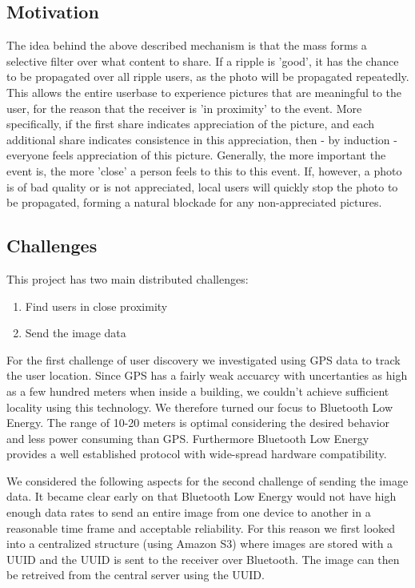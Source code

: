 \documentclass{report}
\begin{document}
\subsection{Motivation}
The idea behind the above described mechanism is that the mass forms a selective filter over what content to share. 
If a ripple is 'good', it has the chance to be propagated over all ripple users, as the photo will be propagated repeatedly. 
This allows the entire userbase to experience pictures that are meaningful to the user, for the reason that the receiver is 'in proximity' to the event. 
More specifically, if the first share indicates appreciation of the picture, and each additional share indicates consistence in this appreciation, then - by induction - everyone feels appreciation of this picture.
Generally, the more important the event is, the more 'close' a person feels to this to this event. 
If, however, a photo is of bad quality or is not appreciated, local users will quickly stop the photo to be propagated, forming a natural blockade for any non-appreciated pictures.

\subsection{Challenges}
This project has two main distributed challenges:
\begin{enumerate} 
    \item Find users in close proximity
    \item Send the image data
\end{enumerate}

For the first challenge of user discovery we investigated using GPS data to track the user location. Since GPS has a fairly weak accuarcy with uncertanties as high as a few hundred meters when inside a building, we couldn't achieve sufficient locality using this technology. We therefore turned our focus to Bluetooth Low Energy. The range of 10-20 meters is optimal considering the desired behavior and less power consuming than GPS. Furthermore Bluetooth Low Energy provides a well established protocol with wide-spread hardware compatibility.

We considered the following aspects for the second challenge of sending the image data.
It became clear early on that Bluetooth Low Energy would not have high enough data rates to send an entire image from one device to another in a reasonable time frame and acceptable reliability. For this reason we first looked into a centralized structure (using Amazon S3) where images are stored with a UUID and the UUID is sent to the receiver over Bluetooth. The image can then be retreived from the central server using the UUID.
\end{document}
